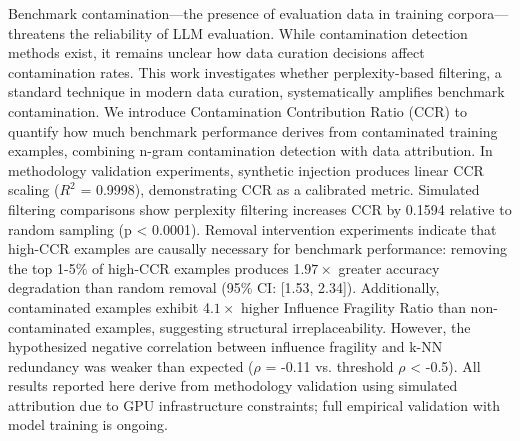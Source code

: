 
Benchmark contamination---the presence of evaluation data in training corpora---threatens the reliability of LLM evaluation. While contamination detection methods exist, it remains unclear how data curation decisions affect contamination rates. This work investigates whether perplexity-based filtering, a standard technique in modern data curation, systematically amplifies benchmark contamination. We introduce Contamination Contribution Ratio (CCR) to quantify how much benchmark performance derives from contaminated training examples, combining n-gram contamination detection with data attribution. In methodology validation experiments, synthetic injection produces linear CCR scaling ($R^2$ = 0.9998), demonstrating CCR as a calibrated metric. Simulated filtering comparisons show perplexity filtering increases CCR by 0.1594 relative to random sampling (p < 0.0001). Removal intervention experiments indicate that high-CCR examples are causally necessary for benchmark performance: removing the top 1-5\% of high-CCR examples produces 1.$97\times$ greater accuracy degradation than random removal (95\% CI: [1.53, 2.34]). Additionally, contaminated examples exhibit 4.$1\times$ higher Influence Fragility Ratio than non-contaminated examples, suggesting structural irreplaceability. However, the hypothesized negative correlation between influence fragility and k-NN redundancy was weaker than expected ($\rho$ = -0.11 vs. threshold $\rho$ < -0.5). All results reported here derive from methodology validation using simulated attribution due to GPU infrastructure constraints; full empirical validation with model training is ongoing.
